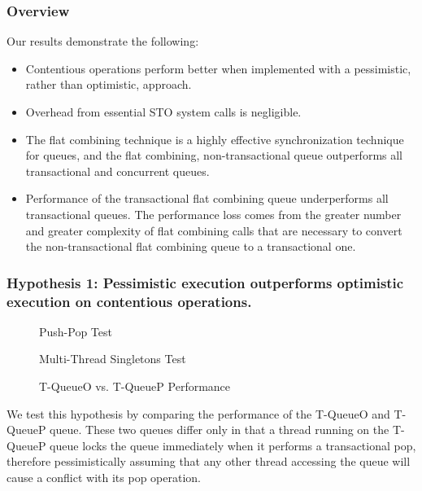 \subsubsection{Overview}
Our results demonstrate the following:
\begin{itemize}
    \item Contentious operations perform better when implemented with a pessimistic, rather than optimistic, approach.
    \item Overhead from essential STO system calls is negligible.
    \item The flat combining technique is a highly effective synchronization technique for queues, and the flat combining, non-transactional queue outperforms all transactional and concurrent queues.
    \item Performance of the transactional flat combining queue underperforms all transactional queues. The performance loss comes from the greater number and greater complexity of flat combining calls that are necessary to convert the non-transactional flat combining queue to a transactional one.
\end{itemize}


\subsubsection{Hypothesis 1: Pessimistic execution outperforms optimistic execution on contentious operations.}
\begin{figure}[t]
    \centering
	\begin{minipage}{0.75\textwidth}
        \caption*{Push-Pop Test}
        \vspace{12pt}
	\end{minipage}
	\begin{minipage}{0.75\textwidth}
        \caption*{Multi-Thread Singletons Test}
	\end{minipage}
    \caption{T-QueueO vs. T-QueueP Performance}
    \label{fig:stoqs}
\end{figure}


We test this hypothesis by comparing the performance of the T-QueueO and T-QueueP queue. These two queues differ only in that a thread running on the T-QueueP queue locks the queue immediately when it performs a transactional pop, therefore pessimistically assuming that any other thread accessing the queue will cause a conflict with its pop operation.

